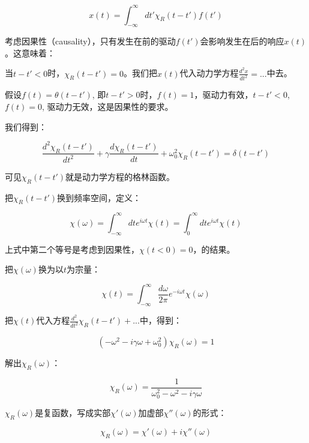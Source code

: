 \begin{equation}
x(t) = \int_{- \infty}^{\infty} dt' \chi_R(t-t') f(t')
\end{equation}

考虑因果性（causality），只有发生在前的驱动$f(t')$会影响发生在后的响应$x(t)$。这意味着：

当$t - t' < 0$时，$\chi_R(t-t') = 0$。我们把$x(t)$代入动力学方程$\frac{d^2 x}{dt^2} = ...$中去。

假设$f(t) = \theta(t-t')$, 即$t- t' >0$时，$f(t) = 1$，驱动力有效，$t-t' <0$, $f(t) = 0$, 驱动力无效，这是因果性的要求。

我们得到：

\begin{equation}
\frac{d^2 \chi_R(t-t')}{d t^2} + \gamma \frac{d \chi_R(t-t')}{dt} + \omega_0^2 \chi_R(t-t') = \delta(t-t')
\end{equation}

可见$\chi_R(t-t')$就是动力学方程的格林函数。

把$\chi_R(t-t')$换到频率空间，定义：

\begin{equation}
\chi(\omega) = \int_{-\infty}^{\infty} dt  e^{i \omega t} \chi (t) = \int_0^{\infty} dt e^{i \omega t} \chi (t)
\end{equation}

上式中第二个等号是考虑到因果性，$\chi(t < 0) = 0$，的结果。

把$\chi(\omega)$换为以$t$为宗量：

\begin{equation}
\chi(t) = \int_{-\infty}^{\infty} \frac{d \omega}{2 \pi} e^{- i \omega t} \chi(\omega)
\end{equation}

把$\chi(t)$代入方程$\frac{d^2}{dt^2} \chi_R (t-t') + ...$中，得到：

\begin{equation}
(- \omega^2 - i \gamma \omega + \omega_0^2 ) \chi_R (\omega)= 1
\end{equation}

解出$\chi_R(\omega)$：

\begin{equation}
\chi_R (\omega) = \frac{1}{\omega_0^2 - \omega^2 - i \gamma \omega }
\end{equation}

$\chi_R(\omega)$是复函数，写成实部$\chi'(\omega)$加虚部$\chi''(\omega)$的形式：

\begin{equation}
\chi_R (\omega) = \chi'(\omega) + i \chi''(\omega)
\end{equation}

